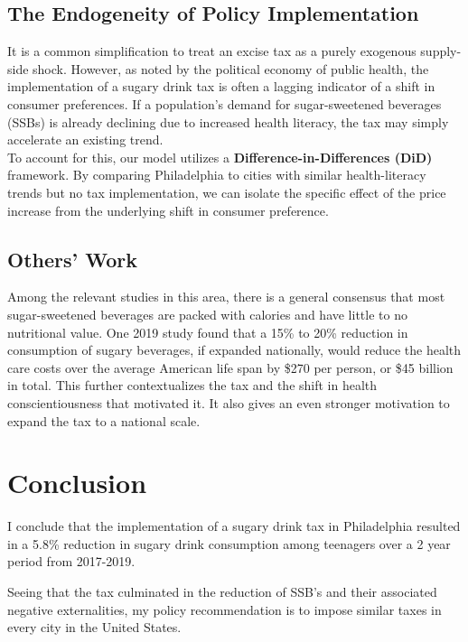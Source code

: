 \documentclass[12pt, a4paper]{article}
\begin{document}
\subsection{The Endogeneity of Policy Implementation}
It is a common simplification to treat an excise tax as a purely exogenous supply-side shock. However, as noted by the political economy of public health, the implementation of a sugary drink tax is often a lagging indicator of a shift in consumer preferences. If a population's demand for sugar-sweetened beverages (SSBs) is already declining due to increased health literacy, the tax may simply accelerate an existing trend. 
\\
To account for this, our model utilizes a \textbf{Difference-in-Differences (DiD)} framework. By comparing Philadelphia to cities with similar health-literacy trends but no tax implementation, we can isolate the specific effect of the price increase from the underlying shift in consumer preference.
\\

\subsection{Others' Work}
Among the relevant studies in this area, there is a general consensus that most sugar-sweetened beverages are packed with calories and have little to no nutritional value. One 2019 study \cite{doi:10.2105/AJPH.2018.304803} found that a 15\% to 20\% reduction in consumption of sugary beverages, if expanded nationally, would reduce the health care costs over the average American life span by \$270 per person, or \$45 billion in total. This further contextualizes the tax and the shift in health conscientiousness that motivated it. It also gives an even stronger motivation to expand the tax to a national scale.


\section{Conclusion}
I conclude that the implementation of a sugary drink tax in Philadelphia resulted in a 5.8\% reduction in sugary drink consumption among teenagers over a 2 year period from 2017-2019.

Seeing that the tax culminated in the reduction of SSB's and their associated negative externalities, my policy recommendation is to impose similar taxes in every city in the United States.

\newpage
\nocite{doi:10.2105/AJPH.2018.304803}
\nocite{CDC_YRBSS_2019}


\end{document}
